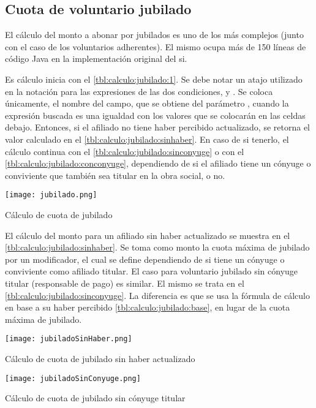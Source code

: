 \subsection{Cuota de voluntario jubilado}

El cálculo del monto a abonar por jubilados es uno de los más complejos (junto con el caso de los voluntarios adherentes).
El mismo ocupa más de 150 líneas de código Java en la implementación original del \acrshort{si}.

Es cálculo inicia con el \cref{tbl:calculo:jubilado:1}.
Se debe notar un atajo utilizado en la notación para las expresiones de las dos condiciones,  y .
Se coloca únicamente, el nombre del campo, que se obtiene del parámetro , cuando la expresión buscada es una igualdad con los valores que se colocarán en las celdas debajo.
Entonces, si el afiliado no tiene haber percibido actualizado, se retorna el valor calculado en el \cref{tbl:calculo:jubilado:sinhaber}. 
En caso de si tenerlo, 
el cálculo continua con el \cref{tbl:calculo:jubilado:sinconyuge} o con el \cref{tbl:calculo:jubilado:conconyuge}, dependiendo de si el afiliado tiene un cónyuge o conviviente que también sea titular en la obra social, o no.

\begin{table*}
    \centering
    \texttt{[image: jubilado.png]}
    \caption{Cálculo de cuota de jubilado}
    \label{tbl:calculo:jubilado:1}
\end{table*}

El cálculo del monto para un afiliado sin haber actualizado se muestra en el \cref{tbl:calculo:jubilado:sinhaber}.
Se toma como monto la cuota máxima de jubilado por un modificador, el cual se define dependiendo de si tiene un cónyuge o conviviente como afiliado titular.
El caso para voluntario jubilado sin cónyuge titular (responsable de pago) es similar.
El mismo se trata en el \cref{tbl:calculo:jubilado:sinconyuge}.
La diferencia es que se usa la fórmula de cálculo en base a su haber percibido \cref{tbl:calculo:jubilado:base}, en lugar de la cuota máxima de jubilado.

\begin{table*}
    \centering
    \texttt{[image: jubiladoSinHaber.png]}
    \caption{Cálculo de cuota de jubilado sin haber actualizado}
    \label{tbl:calculo:jubilado:sinhaber}
\end{table*}


\begin{table*}
    \centering
    \texttt{[image: jubiladoSinConyuge.png]}
    \caption{Cálculo de cuota de jubilado sin cónyuge titular}
    \label{tbl:calculo:jubilado:sinconyuge}
\end{table*}

